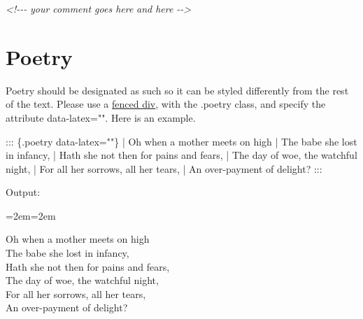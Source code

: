 \documentclass[
]{book}
\newenvironment{Shaded}{\begin{snugshade}}{\end{snugshade}}
\newcommand{\CommentTok}[1]{\textcolor[rgb]{0.56,0.35,0.01}{\textit{#1}}}
\newcommand{\NormalTok}[1]{#1}
\newenvironment{poetry}[0]{\par\leftskip=2em\rightskip=2em}{\par\medskip}
\begin{document}
\begin{Shaded}
\begin{Highlighting}[]
\CommentTok{\textless{}!{-}{-}{-}}
\CommentTok{your comment goes here}
\CommentTok{and here}
\CommentTok{{-}{-}\textgreater{}}
\end{Highlighting}
\end{Shaded}

\hypertarget{poetry}{%
\chapter{Poetry}\label{poetry}}

Poetry should be designated as such so it can be styled differently from the rest of the text. Please use a \href{https://pandoc.org/MANUAL.html\#divs-and-spans}{fenced div}, with the .poetry class, and specify the attribute data-latex="". Here is an example.

\begin{Shaded}
\begin{Highlighting}[]
\NormalTok{::: \{.poetry data{-}latex=""\}}
\NormalTok{| Oh when a mother meets on high}
\NormalTok{| The babe she lost in infancy,}
\NormalTok{| Hath she not then for pains and fears,}
\NormalTok{|     The day of woe, the watchful night,}
\NormalTok{| For all her sorrows, all her tears,}
\NormalTok{|     An over{-}payment of delight?}
\NormalTok{:::}
\end{Highlighting}
\end{Shaded}

Output:

\begin{poetry}

Oh when a mother meets on high\\
The babe she lost in infancy,\\
Hath she not then for pains and fears,\\
\hspace*{0.333em}\hspace*{0.333em}\hspace*{0.333em}\hspace*{0.333em}The day of woe, the watchful night,\\
For all her sorrows, all her tears,\\
\hspace*{0.333em}\hspace*{0.333em}\hspace*{0.333em}\hspace*{0.333em}An over-payment of delight?

\end{poetry}
\end{document}
